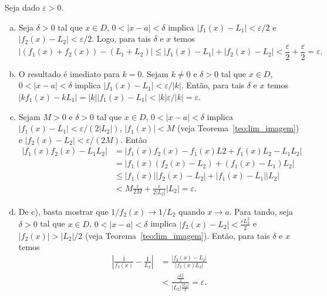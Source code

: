 \begin{dem}
  Seja dado $\varepsilon>0$.
  \begin{enumerate}[a)]
  \item Seja $\delta>0$ tal que $x\in D$, $0<|x-a|<\delta$ implica $|f_1(x)-L_1|<\varepsilon/2$ e $|f_2(x)-L_2|<\varepsilon/2$. Logo, para tais $\delta$ e $x$ temos 
    \begin{equation}
      |(f_1(x)+f_2(x)) - (L_1+L_2)| \leq |f_1(x)-L_1|+|f_2(x)-L_2| < \frac{\varepsilon}{2}+\frac{\varepsilon}{2} = \varepsilon.
\end{equation}
  \item O resultado é imediato para $k=0$. Sejam $k\neq 0$ e $\delta>0$ tal que $x\in D$, $0<|x-a|<\delta$ implica $|f_1(x)-L_1|<\varepsilon/|k|$. Então, para tais $\delta$ e $x$ temos $|kf_1(x)-kL_1| = |k||f_1(x)-L_1| < |k|\varepsilon/|k| = \varepsilon$.
  \item Sejam $M>0$ e $\delta>0$ tal que $x\in D$, $0<|x-a|<\delta$ implica $|f_1(x)-L_1| < \varepsilon/(2|L_2|)$, $|f_1(x)| < M$ (veja Teorema~\ref{teo:lim_imagem}) e $|f_2(x)-L_2| < \varepsilon/(2M)$. Então
    \begin{align}
      |f_1(x)f_2(x)-L_1L_2| &= |f_1(x)f_2(x)-f_1(x)L2+f_1(x)L_2-L_1L_2|\\
                            &= |f_1(x)(f_2(x)-L_2)+(f_1(x)-L_1)L_2|\\
                            &\leq |f_1(x)||f_2(x)-L_2|+|f_1(x)-L_1||L_2|\\
                            &< M\frac{\varepsilon}{2M}+\frac{\varepsilon}{2|L_2|}|L_2| = \varepsilon.
    \end{align}
  \item De c), basta mostrar que $1/f_2(x)\to 1/L_2$ quando $x\to a$. Para tando, seja $\delta>0$ tal que $x\in D$, $0<|x-a|<\delta$ implica $|f_2(x)-L_2|<\frac{\varepsilon L_2^2}{2}$ e $|f_2(x)|>|L_2|/2$ (veja Teorema~\ref{teo:lim_imagem}). Então, para tais $\delta$ e $x$ temos
    \begin{align}
      \left|\frac{1}{f_2(x)}-\frac{1}{L_2}\right| &= \frac{|f_2(x)-L_2|}{|f_2(x)L_2|}\\
                                                  &< \frac{\frac{\varepsilon L_2^2}{2}}{|L_2|\frac{|L_2|}{2}} = \varepsilon.
    \end{align}
  \end{enumerate}
\end{dem}

